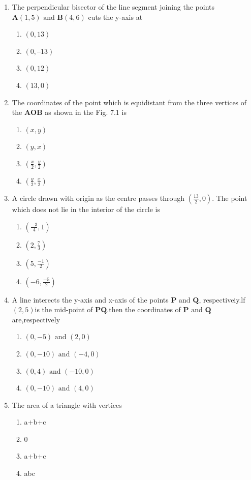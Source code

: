 \documentclass[12pt]{article}
\let\vec\mathbf
\begin{document}
\begin{enumerate}
\item The perpendicular bisector of the line segment joining the points $\vec{A} (1, 5) \text{ and }
\vec{B} (4, 6)$ cuts the y-axis at
\begin{enumerate}
	\item$(0, 13)$ 
	\item $(0, –13)$
	\item$(0, 12) $
	\item$(13, 0)$
\end{enumerate}
\item The coordinates of the point which
	is equidistant from the three vertices of the  $\vec{AOB}$ as shown in the
Fig. 7.1 is
\begin{enumerate}
	\item $(x, y)$
	\item $(y, x)$
	\item $(\frac{x}{2},\frac{y}{2})$
\item $(\frac{y}{2},\frac{x}{2})$
\end{enumerate}
\item A circle drawn with origin as the
centre passes through 
$(\frac{13}{2},0)$. The
point which does not lie in the
interior of the circle is
\begin{enumerate}
\item $(\frac{-3}{4},1)$
\item $(2,\frac{7}{3})$
\item $(5,\frac{-1}{2})$
\item $(-6,\frac{-5}{2})$
\end{enumerate}
\item A line interects the y-axis and x-axis of the points $\vec{P} \text{ and }\vec{Q}$, respectiveiy.lf $(2,5)$is the mid-point of $\vec{PQ}$.then the coordinates of $\vec{P} \text{ and } \vec{Q}$ are,respectively
\begin{enumerate}
	\item$(0,-5)\text{ and }(2,0)$
	\item$(0,-10)\text{ and }(-4,0)$
	\item$(0,4)\text{ and } (-10,0)$
	\item$(0,-10)\text{ and }(4,0)$
\end{enumerate}
\item The area of a triangle with vertices
\begin{enumerate}
	\item a+b+c
\item 0
\item a+b+c
\item abc 

\end{enumerate}
\end{enumerate}
\end{document}
